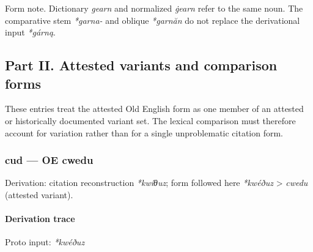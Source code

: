 \documentclass[
  british,
  a4paper,
]{article}
\begin{document}
Form note. Dictionary \emph{gearn} and normalized \emph{ġearn} refer to
the same noun. The comparative stem \emph{*garna-} and oblique
\emph{*garnăn} do not replace the derivational input \emph{*gárną}.

\clearpage

\subsection{Part II. Attested variants and comparison
forms}\label{part-ii.-attested-variants-and-comparison-forms}

These entries treat the attested Old English form as one member of an
attested or historically documented variant set. The lexical comparison
must therefore account for variation rather than for a single
unproblematic citation form.

\subsubsection{cud --- OE cwedu}\label{cud-oe-cwedu}

Derivation: citation reconstruction \emph{*kwíθuz}; form followed here
\emph{*kwéðuz} \textgreater{} \emph{cwedu} (attested variant).

\paragraph{Derivation trace}\label{derivation-trace}

Proto input: \emph{*kwéðuz}

\begingroup
\setlength{\fboxsep}{6pt}
\end{document}
